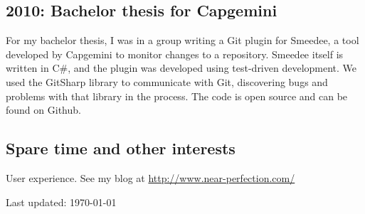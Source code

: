 \documentclass[letterpaper]{article}
\renewenvironment{itemize}{
  \begin{list}{}{
    \setlength{\leftmargin}{1.5em}
  }
}{
  \end{list}
}
\begin{document}
\subsection*{2010: Bachelor thesis for Capgemini}
For my bachelor thesis, I was in a group writing a Git plugin for Smeedee, a tool developed by Capgemini to monitor
changes to a repository. Smeedee itself is written in C\#, and the
plugin was developed using test-driven development. We used the
GitSharp library to communicate with Git, discovering bugs and problems
with that library in the process. The code is open source and can be
found on Github.

\subsection*{Spare time and other interests}
\begin{itemize}
\item User experience. See my blog at \url{http://www.near-perfection.com/}
\end{itemize}

\begin{center}
\begin{footnotesize}
Last updated: \today \\
\end{footnotesize}
\end{center}
\end{document}

